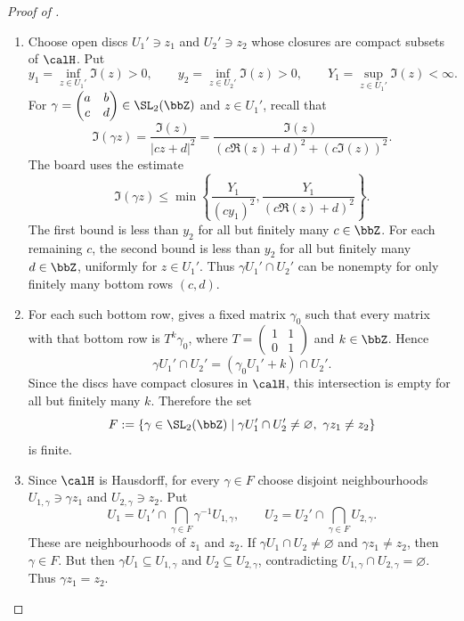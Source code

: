\begin{proof}[Proof of ]
    \leavevmode
    \begin{enumerate}[label=\textit{Step~\arabic*.}]
        \item Choose open discs $U_1' \ni z_1$ and $U_2' \ni z_2$ whose closures are compact subsets of $\calH$. Put
        \[
            y_1 = \inf_{z \in U_1'}\Im(z) > 0, \qquad y_2 = \inf_{z \in U_2'}\Im(z) > 0, \qquad Y_1 = \sup_{z \in U_1'}\Im(z) < \infty.
        \]
        For $\gamma = \begin{pmatrix}a & b\\ c & d\end{pmatrix} \in \SL_2(\bbZ)$ and $z \in U_1'$, recall that
        \[
            \Im(\gamma z) = \frac{\Im(z)}{|cz + d|^2} = \frac{\Im(z)}{(c\Re(z) + d)^2 + (c\Im(z))^2}.
        \]
        The board uses the estimate
        \[
            \Im(\gamma z) \le \min\left\{\frac{Y_1}{(cy_1)^2}, \frac{Y_1}{(c\Re(z) + d)^2}\right\}.
        \]
        The first bound is less than $y_2$ for all but finitely many $c \in \bbZ$. For each remaining $c$, the second bound is less than $y_2$ for all but finitely many $d \in \bbZ$, uniformly for $z \in U_1'$. Thus $\gamma U_1' \cap U_2'$ can be nonempty for only finitely many bottom rows $(c, d)$.
        \item For each such bottom row,  gives a fixed matrix $\gamma_0$ such that every matrix with that bottom row is $T^k\gamma_0$, where $T = \begin{pmatrix}1 & 1\\ 0 & 1\end{pmatrix}$ and $k \in \bbZ$. Hence
        \[
            \gamma U_1' \cap U_2' = (\gamma_0 U_1' + k) \cap U_2'.
        \]
        Since the discs have compact closures in $\calH$, this intersection is empty for all but finitely many $k$. Therefore the set
        \[
            F := \{\gamma \in \SL_2(\bbZ) \mid \gamma U_1' \cap U_2' \neq \varnothing,\ \gamma z_1 \neq z_2\}
        \]
        is finite.
        \item Since $\calH$ is Hausdorff, for every $\gamma \in F$ choose disjoint neighbourhoods $U_{1,\gamma} \ni \gamma z_1$ and $U_{2,\gamma} \ni z_2$. Put
        \[
            U_1 = U_1' \cap \bigcap_{\gamma \in F}\gamma^{-1}U_{1,\gamma}, \qquad U_2 = U_2' \cap \bigcap_{\gamma \in F}U_{2,\gamma}.
        \]
        These are neighbourhoods of $z_1$ and $z_2$. If $\gamma U_1 \cap U_2 \neq \varnothing$ and $\gamma z_1 \neq z_2$, then $\gamma \in F$. But then $\gamma U_1 \subseteq U_{1,\gamma}$ and $U_2 \subseteq U_{2,\gamma}$, contradicting $U_{1,\gamma} \cap U_{2,\gamma} = \varnothing$. Thus $\gamma z_1 = z_2$.
    \end{enumerate}
\end{proof}

